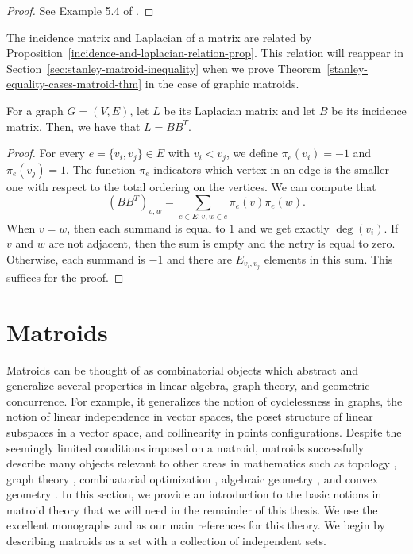 \documentclass{puthesis-UG}
\begin{document}
\begin{proof}
	See Example 5.4 of \cite{bapat_raghavan_1997}. 
\end{proof}

The incidence matrix and Laplacian of a matrix are related by Proposition~\ref{incidence-and-laplacian-relation-prop}. This relation will reappear in Section~\ref{sec:stanley-matroid-inequality} when we prove Theorem~\ref{stanley-equality-cases-matroid-thm} in the case of graphic matroids. 

\begin{prop} \label{incidence-and-laplacian-relation-prop}
	For a graph $G = (V, E)$, let $L$ be its Laplacian matrix and let $B$ be its incidence matrix. Then, we have that $L = BB^T$. 
\end{prop}

\begin{proof}
	For every $e = \{v_i, v_j\} \in E$ with $v_i < v_j$, we define $\pi_e(v_i) = -1$ and $\pi_e (v_j) = 1$. The function $\pi_e$ indicators which vertex in an edge is the smaller one with respect to the total ordering on the vertices. We can compute that 
	\[
		(BB^T)_{v, w} = \sum_{e \in E : v, w \in e} \pi_e(v) \pi_e(w). 
	\]
	When $v = w$, then each summand is equal to $1$ and we get exactly $\deg (v_i)$. If $v$ and $w$ are not adjacent, then the sum is empty and the netry is equal to zero. Otherwise, each summand is $-1$ and there are $E_{v_i, v_j}$ elements in this sum. This suffices for the proof. 
\end{proof}

\section{Matroids} \label{sec:matroids}

Matroids can be thought of as combinatorial objects which abstract and generalize several properties in linear algebra, graph theory, and geometric concurrence. For example, it generalizes the notion of cyclelessness in graphs, the notion of linear independence in vector spaces, the poset structure of linear subspaces in a vector space, and collinearity in points configurations. Despite the seemingly limited conditions imposed on a matroid, matroids successfully describe many objects relevant to other areas in mathematics such as topology \cite{gelfand}, graph theory \cite{milnor-numbers}, combinatorial optimization \cite{optimization}, algebraic geometry \cite{schubert-cell}, and convex geometry \cite{matroid-polytope}. In this section, we provide an introduction to the basic notions in matroid theory that we will need in the remainder of this thesis. We use the excellent monographs \cite{10.5555/1197093} and \cite{welsh} as our main references for this theory. We begin by describing matroids as a set with a collection of independent sets. 
\end{document}
